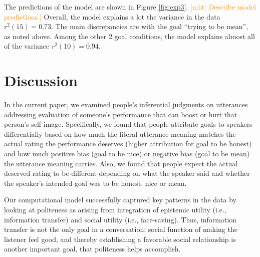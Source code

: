 \documentclass[10pt,letterpaper]{article}
\newcommand{\mht}[1]{\textcolor{DarkOrange}{[mht: #1]}}
\begin{document}
The predictions of the model are shown in Figure \ref{fig:exp3}.
\mht{Describe model predictions.}
Overall, the model explains a lot the variance in the data $r^2(15) = 0.73$. 
The main discrepancies are with the goal ``trying to be mean'', as noted above. 
Among the other 2 goal conditions, the model explains almost all of the variance $r^2(10) = 0.94$. 

\section{Discussion}

In the current paper, we examined people's inferential judgments on utterances addressing evaluation of someone's performance that can boost or hurt that person's self-image. Specifically, we found that people attribute goals to speakers differentially based on how much the literal utterance meaning matches the actual rating the performance deserves (higher attribution for goal to be honest) and how much positive bias (goal to be nice) or negative bias (goal to be mean) the utterance meaning carries. Also, we found that people expect the actual deserved rating to be different depending on what the speaker said and whether the speaker's intended goal was to be honest, nice or mean. 

Our computational model successfully captured key patterns in the data by looking at politeness as arising from integration of epistemic utility (i.e., information transfer) and social utility (i.e., face-saving). Thus, information transfer is not the only goal in a conversation; social function of making the listener feel good, and thereby establishing a favorable social relationship is another important goal, that politeness helps accomplish.




\setlength{\bibleftmargin}{.125in}
\setlength{\bibindent}{-\bibleftmargin}


\end{document}
